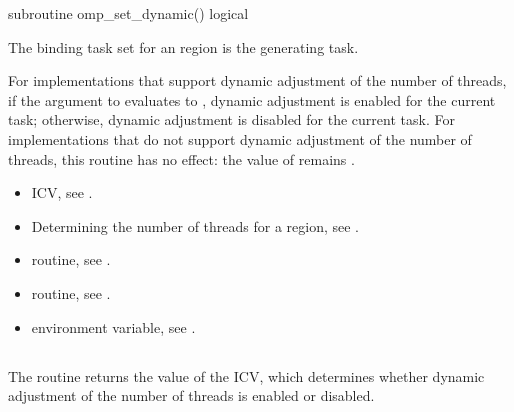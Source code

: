 \begin{samepage}
\begin{fortranspecific}
\begin{ompfSubroutine}
subroutine omp_set_dynamic()
logical 
\end{ompfSubroutine}
\end{fortranspecific}
\end{samepage}

\binding
The binding task set for an  region is the generating task.

\effect
For implementations that support dynamic adjustment of the number 
of threads, if the argument to  evaluates to 
, dynamic adjustment is enabled for the current task; 
otherwise, dynamic adjustment is disabled for the current task. 
For implementations that do not support dynamic adjustment of the 
number of threads, this routine has no effect: the value of 
 remains .

\crossreferences
\begin{itemize}
\item {} ICV, see
.

\item Determining the number of threads for a  region, see
.

\item {} routine, see
.

\item {} routine, see
.

\item {} environment variable, see
.
\end{itemize}



\subsection{}
\label{subsec:omp_get_dynamic}
\summary
The  routine returns the value of the 
 ICV, which determines whether dynamic adjustment 
of the number of threads is enabled or disabled.

